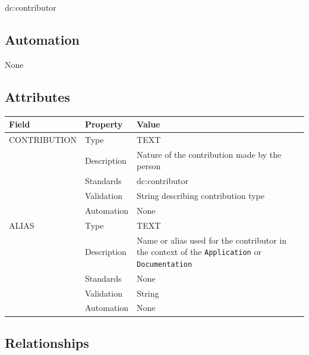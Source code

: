 \documentclass[
]{article}
\newcounter{none} %
\begin{document}
dc:contributor

\subsection{Automation}\label{automation-11}

None

\subsection{Attributes}\label{attributes-11}

{\def\LTcaptype{none} %
\begin{longtable}[]{@{}
  >{\raggedright\arraybackslash}p{}
  >{\raggedright\arraybackslash}p{}
  >{\raggedright\arraybackslash}p{}@{}}
\toprule\noalign{}
\begin{minipage}[b]{\linewidth}\raggedright
Field
\end{minipage} & \begin{minipage}[b]{\linewidth}\raggedright
Property
\end{minipage} & \begin{minipage}[b]{\linewidth}\raggedright
Value
\end{minipage} \\
\midrule\noalign{}
\endhead
\bottomrule\noalign{}
\endlastfoot
CONTRIBUTION & Type & TEXT \\
& Description & Nature of the contribution made by the person \\
& Standards & dc:contributor \\
& Validation & String describing contribution type \\
& Automation & None \\
ALIAS & Type & TEXT \\
& Description & Name or alias used for the contributor in the context of
the \texttt{Application} or \texttt{Documentation} \\
& Standards & None \\
& Validation & String \\
& Automation & None \\
\end{longtable}
}

\subsection{Relationships}\label{relationships-7}
\end{document}
